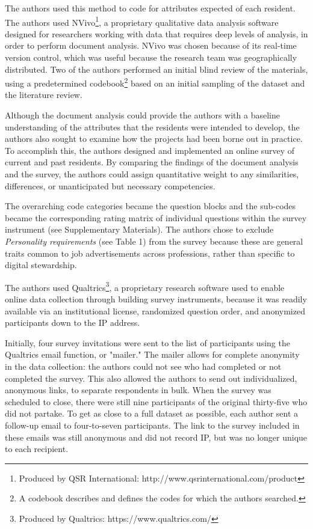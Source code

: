 \documentclass{acm_proc_article-sp}
\begin{document}
The authors used this method to code for attributes expected of each resident. The authors used NVivo\footnote{Produced by QSR International: http://www.qsrinternational.com/product}, a proprietary qualitative data analysis software designed for researchers working with data that requires deep levels of analysis, in order to perform document analysis. NVivo was chosen because of its real-time version control, which was useful because the research team was geographically distributed. Two of the authors performed an initial blind review of the materials, using a predetermined codebook\footnote{A codebook describes and defines the codes for which the authors searched.} based on an initial sampling of the dataset and the literature review. 

Although the document analysis could provide the authors with a baseline understanding of the attributes that the residents were intended to develop, the authors also sought to examine how the projects had been borne out in practice. To accomplish this, the authors designed and implemented an online survey of current and past residents. By comparing the findings of the document analysis and the survey, the authors could assign quantitative weight to any similarities, differences, or unanticipated but necessary competencies.

The overarching code categories became the question blocks and the sub-codes became the corresponding rating matrix of individual questions within the survey instrument (see Supplementary Materials). The authors chose to exclude \textit{Personality requirements} (see Table 1) from the survey because these are general traits common to job advertisements across professions, rather than specific to digital stewardship. 

The authors used Qualtrics\footnote{Produced by Qualtrics: https://www.qualtrics.com/}, a proprietary research software used to enable online data collection through building survey instruments, because it was readily available via an institutional license, randomized question order, and anonymized participants down to the IP address.

Initially, four survey invitations were sent to the list of participants using the Qualtrics email function, or "mailer." The mailer allows for complete anonymity in the data collection: the authors could not see who had completed or not completed the survey. This also allowed the authors to send out individualized, anonymous links, to separate respondents in bulk. When the survey was scheduled to close, there were still nine participants of the original thirty-five who did not partake. To get as close to a full dataset as possible, each author sent a follow-up email to four-to-seven participants. The link to the survey included in these emails was still anonymous and did not record IP, but was no longer unique to each recipient. 
\end{document}
